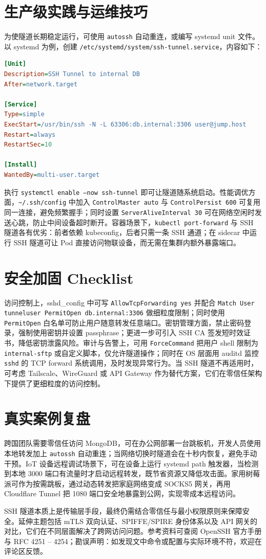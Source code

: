 \chapter{生产级实践与运维技巧}
为使隧道长期稳定运行，可使用 \texttt{autossh} 自动重连，或编写 systemd unit 文件。以 systemd 为例，创建 \texttt{/etc/systemd/system/ssh-tunnel.service}，内容如下：\par
\begin{lstlisting}[language=ini]
[Unit]
Description=SSH Tunnel to internal DB
After=network.target

[Service]
Type=simple
ExecStart=/usr/bin/ssh -N -L 63306:db.internal:3306 user@jump.host
Restart=always
RestartSec=10

[Install]
WantedBy=multi-user.target
\end{lstlisting}
执行 \texttt{systemctl enable --now ssh-tunnel} 即可让隧道随系统启动。性能调优方面，\texttt{\~{}/.ssh/config} 中加入 \texttt{ControlMaster auto} 与 \texttt{ControlPersist 600} 可复用同一连接，避免频繁握手；同时设置 \texttt{ServerAliveInterval 30} 可在网络空闲时发送心跳，防止中间设备超时断开。容器场景下，\texttt{kubectl port-forward} 与 SSH 隧道各有优劣：前者依赖 kubeconfig，后者只需一条 SSH 通道；在 sidecar 中运行 SSH 隧道可让 Pod 直接访问物联设备，而无需在集群内额外暴露端口。\par
\chapter{安全加固 Checklist}
访问控制上，sshd\_{}config 中可写 \texttt{AllowTcpForwarding yes} 并配合 \texttt{Match User tunneluser PermitOpen db.internal:3306} 做细粒度限制；同时使用 \texttt{PermitOpen} 白名单可防止用户随意转发任意端口。密钥管理方面，禁止密码登录，强制使用密钥并设置 passphrase；更进一步可引入 SSH CA 签发短时效证书，降低密钥泄露风险。审计与告警上，可用 \texttt{ForceCommand} 把用户 shell 限制为 \texttt{internal-sftp} 或自定义脚本，仅允许隧道操作；同时在 OS 层面用 auditd 监控 \texttt{sshd} 的 TCP forward 系统调用，及时发现异常行为。当 SSH 隧道不再适用时，可考虑 Tailscale、WireGuard 或 API Gateway 作为替代方案，它们在零信任架构下提供了更细粒度的访问控制。\par
\chapter{真实案例复盘}
跨国团队需要零信任访问 MongoDB，可在办公网部署一台跳板机，开发人员使用本地转发加上 \texttt{autossh} 自动重连；当网络切换时隧道会在十秒内恢复，避免手动干预。IoT 设备远程调试场景下，可在设备上运行 systemd path 触发器，当检测到本地 3000 端口有流量时才启动远程转发，既节省资源又降低攻击面。家用树莓派可作为按需跳板，通过动态转发把家庭网络变成 SOCKS5 网关，再用 Cloudflare Tunnel 把 1080 端口安全地暴露到公网，实现零成本远程访问。\par
SSH 隧道本质上是传输层手段，最终仍需结合零信任与最小权限原则来保障安全。延伸主题包括 mTLS 双向认证、SPIFFE/SPIRE 身份体系以及 API 网关的对比，它们在不同层面解决了跨网访问问题。参考资料可查阅 OpenSSH 官方手册与 RFC 4251 – 4254；勘误声明：如发现文中命令或配置与实际环境不符，欢迎在评论区反馈。\par
